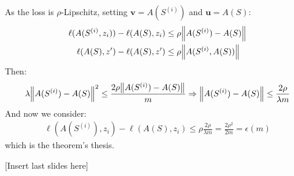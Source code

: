 \documentclass[../template.tex]{subfiles}
\begin{document}
As the loss is $\rho$-Lipschitz, setting $\bm{v} = A(S^{(i)})$ and $\bm{u} = A(S)$:
\begin{align*}
    \ell(A(S^{(i)}, z_i)) - \ell(A(S), z_i) &\leq \rho \norm{A(S^{(i)})- A(S)}\\
    \ell(A(S), z') - \ell(A(S), z') &\leq \rho\norm{A(S^{(i)}, A(S))} 
\end{align*}  
Then:
\begin{align*}
    \lambda \norm{A(S^{(i)})-A(S)}^2 \leq \frac{2 \rho \norm{A(S^{(i)}) - A(S)}}{m} \Rightarrow \norm{A(S^{(i)}) - A(S)} \leq \frac{2 \rho}{\lambda m}  
\end{align*}
And now we consider:
\begin{align*}
    \ell (A(S^{(i)}), z_i) - \ell(A(S), z_i) \leq \rho \frac{2 \rho}{\lambda m} = \frac{2 \rho^2}{2 m} = \epsilon(m)  
\end{align*}
which is the theorem's thesis.

[Insert last slides here]
\end{document}
